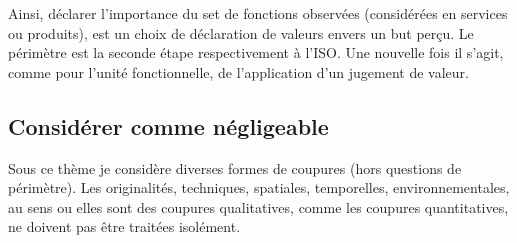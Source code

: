 Ainsi, déclarer l'importance du set de fonctions observées (considérées en services ou produits), est un choix de déclaration de valeurs envers un but perçu.
Le périmètre est la seconde étape respectivement à l'ISO.
Une nouvelle fois il s'agit, comme pour l'unité fonctionnelle, de l'application d'un jugement de valeur.


\subsection{Considérer comme négligeable}
Sous ce thème je considère diverses formes de coupures (hors questions de périmètre).
Les originalités, techniques, spatiales, temporelles, environnementales, au sens ou elles sont des coupures qualitatives, comme les coupures quantitatives, ne doivent pas être traitées isolément.



